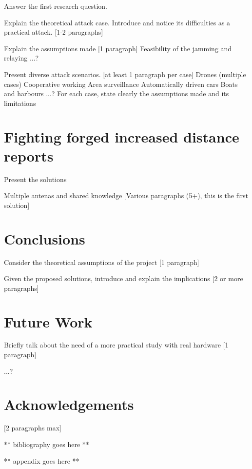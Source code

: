 \documentclass{article}
\begin{document}
Answer the first research question.




Explain the theoretical attack case. Introduce and notice its difficulties as a practical attack. [1-2 paragraphs]

Explain the assumptions made [1 paragraph]
   Feasibility of the jamming and relaying
   ...?
   
Present diverse attack scenarios. [at least 1 paragraph per case]
   Drones (multiple cases)
     Cooperative working
     Area surveillance
   Automatically driven cars
   Boats and harbours
  ...?
For each case, state clearly the assumptions made and its limitations


\section{Fighting forged increased distance reports}

Present the solutions

Multiple antenas and shared knowledge [Various paragraphs (5+), this is the first solution]

\section{Conclusions}

Consider the theoretical assumptions of the project [1 paragraph]

Given the proposed solutions, introduce and explain the implications [2 or more paragraphs]

\section{Future Work}

Briefly talk about the need of a more practical study with real hardware [1 paragraph]

...?

\section{Acknowledgements}

[2 paragraphs max]

\printbibliography

** bibliography goes here **

** appendix goes here **

\end{document}
